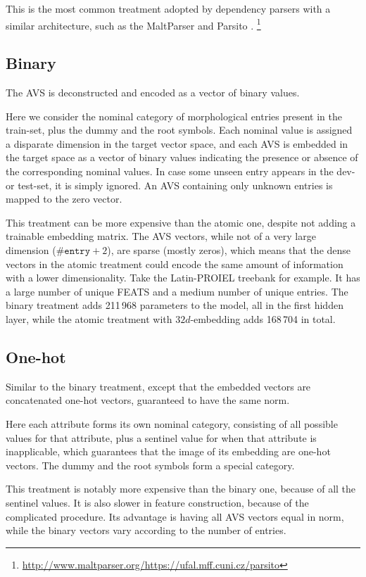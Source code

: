 \documentclass[11pt]{article}
\begin{document}
This is the most common treatment adopted by dependency parsers with a similar architecture,
such as the MaltParser \parencite{nivre2006maltparser} and Parsito \parencite{udparsing:2015}.%
\footnote{\url{http://www.maltparser.org/}\hfil\url{https://ufal.mff.cuni.cz/parsito}}

\subsection*{Binary}

The AVS is deconstructed and encoded as a vector of binary values.

Here we consider the nominal category of morphological entries present in the train-set,
plus the dummy and the root symbols.
Each nominal value is assigned a disparate dimension in the target vector space,
and each AVS is embedded in the target space as a vector of binary values indicating the presence or absence of the corresponding nominal values.
In case some unseen entry appears in the dev- or test-set,
it is simply ignored.
An AVS containing only unknown entries is mapped to the zero vector.

This treatment can be more expensive than the atomic one,
despite not adding a trainable embedding matrix.
The AVS vectors, while not of a very large dimension (\(\texttt{\#entry} + 2\)), are sparse (mostly zeros),
which means that the dense vectors in the atomic treatment could encode the same amount of information with a lower dimensionality.
Take the Latin-PROIEL treebank for example.
It has a large number of unique FEATS and a medium number of unique entries.
The binary treatment adds 211\,968 parameters to the model,
all in the first hidden layer,
while the atomic treatment with \(32d\)-embedding adds 168\,704 in total.

\subsection*{One-hot}

Similar to the binary treatment,
except that the embedded vectors are concatenated one-hot vectors,
guaranteed to have the same norm.

Here each attribute forms its own nominal category,
consisting of all possible values for that attribute,
plus a sentinel value for when that attribute is inapplicable,
which guarantees that the image of its embedding are one-hot vectors.
The dummy and the root symbols form a special category.

This treatment is notably more expensive than the binary one, because of all the sentinel values.
It is also slower in feature construction, because of the complicated procedure.
Its advantage is having all AVS vectors equal in norm,
while the binary vectors vary according to the number of entries.
\end{document}

